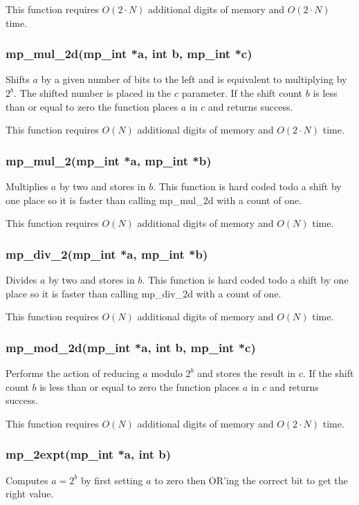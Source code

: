 \documentclass[]{article}
\begin{document}
This function requires $O(2 \cdot N)$ additional digits of memory and $O(2 \cdot N)$ time.

\subsubsection{mp\_mul\_2d(mp\_int *a, int b, mp\_int *c)}
Shifts $a$ by a given number of bits to the left and is equivalent to multiplying by $2^b$.  The shifted number
is placed in the $c$ parameter.  If the shift count $b$ is less than or equal to zero the function places $a$
in $c$ and returns success.  

This function requires $O(N)$ additional digits of memory and $O(2 \cdot N)$ time.

\subsubsection{mp\_mul\_2(mp\_int *a, mp\_int *b)}
Multiplies $a$ by two and stores in $b$.  This function is hard coded todo a shift by one place so it is faster
than calling mp\_mul\_2d with a count of one.  

This function requires $O(N)$ additional digits of memory and $O(N)$ time.

\subsubsection{mp\_div\_2(mp\_int *a, mp\_int *b)}
Divides $a$ by two and stores in $b$.  This function is hard coded todo a shift by one place so it is faster
than calling mp\_div\_2d with a count of one.

This function requires $O(N)$ additional digits of memory and $O(N)$ time.

\subsubsection{mp\_mod\_2d(mp\_int *a, int b, mp\_int *c)}
Performs the action of reducing $a$ modulo $2^b$ and stores the result in $c$.  If the shift count $b$ is less than 
or equal to zero the function places $a$ in $c$ and returns success.  

This function requires $O(N)$ additional digits of memory and $O(2 \cdot N)$ time.

\subsubsection{mp\_2expt(mp\_int *a, int b)}
Computes $a = 2^b$ by first setting $a$ to zero then OR'ing the correct bit to get the right value.
\end{document}
